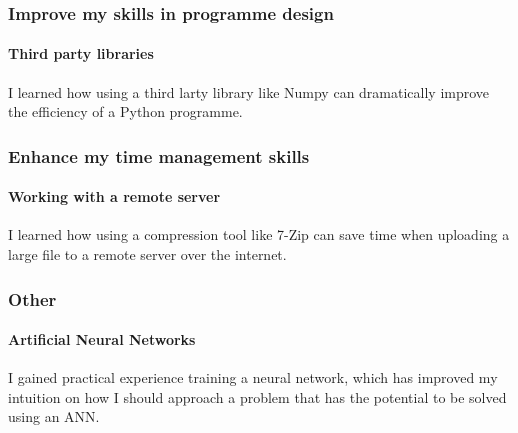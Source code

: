         \subsubsection{Improve my skills in programme design}
            \paragraph{Third party libraries} I learned how using a third larty library like Numpy can dramatically improve the efficiency of a Python programme.
        \subsubsection{Enhance my time management skills}
            \paragraph{Working with a remote server} I learned how using a compression tool like 7-Zip can save time when uploading a large file to a remote server over the internet.
        \subsubsection{Other}
            \paragraph{Artificial Neural Networks} I gained practical experience training a neural network, which has improved my intuition on how I should approach a problem that has the potential to be solved using an ANN.
